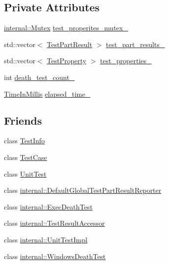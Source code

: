 \subsection*{Private Attributes}
\begin{DoxyCompactItemize}
\item 
\hyperlink{classtesting_1_1internal_1_1Mutex}{internal\+::\+Mutex} \hyperlink{classtesting_1_1TestResult_a58d7d97bd16a04b932e2863153c13dff}{test\+\_\+properites\+\_\+mutex\+\_\+}
\item 
std\+::vector$<$ \hyperlink{classtesting_1_1TestPartResult}{Test\+Part\+Result} $>$ \hyperlink{classtesting_1_1TestResult_af17c00fae1435d344b318eb6bbb56cff}{test\+\_\+part\+\_\+results\+\_\+}
\item 
std\+::vector$<$ \hyperlink{classtesting_1_1TestProperty}{Test\+Property} $>$ \hyperlink{classtesting_1_1TestResult_a29cde491988faff4ef2d9f9b6c13d9fa}{test\+\_\+properties\+\_\+}
\item 
int \hyperlink{classtesting_1_1TestResult_a3810b34e68f5dca9ad1237a5bde7fa21}{death\+\_\+test\+\_\+count\+\_\+}
\item 
\hyperlink{namespacetesting_a992de1d091ce660f451d1e8b3ce30fd6}{Time\+In\+Millis} \hyperlink{classtesting_1_1TestResult_a739a8ca54db4be004ba748b11e82b056}{elapsed\+\_\+time\+\_\+}
\end{DoxyCompactItemize}
\subsection*{Friends}
\begin{DoxyCompactItemize}
\item 
class \hyperlink{classtesting_1_1TestResult_a4c49c2cdb6c328e6b709b4542f23de3c}{Test\+Info}
\item 
class \hyperlink{classtesting_1_1TestResult_aff779e55b06adfa7c0088bd10253f0f0}{Test\+Case}
\item 
class \hyperlink{classtesting_1_1TestResult_a832b4d233efee1a32feb0f4190b30d39}{Unit\+Test}
\item 
class \hyperlink{classtesting_1_1TestResult_abae39633da9932847b41cb80efd62115}{internal\+::\+Default\+Global\+Test\+Part\+Result\+Reporter}
\item 
class \hyperlink{classtesting_1_1TestResult_adf5553cae6aea6f8648d47e299237e34}{internal\+::\+Exec\+Death\+Test}
\item 
class \hyperlink{classtesting_1_1TestResult_ae762da04e74a0d3b0daded3c5bd4a8e8}{internal\+::\+Test\+Result\+Accessor}
\item 
class \hyperlink{classtesting_1_1TestResult_acc0a5e7573fd6ae7ad1878613bb86853}{internal\+::\+Unit\+Test\+Impl}
\item 
class \hyperlink{classtesting_1_1TestResult_a6aeedc04a0590fcc1b3c5f687dbb0f9f}{internal\+::\+Windows\+Death\+Test}
\end{DoxyCompactItemize}


